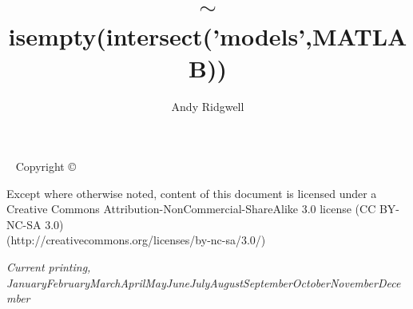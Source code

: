 \documentclass{tufte-book} %
\title{\(\sim\)isempty(intersect('models',MATLAB))} %
\author{Andy Ridgwell} %
\newcommand{\monthyear}{\ifcase\month\or January\or February\or March\or April\or May\or June\or July\or August\or September\or October\or November\or December\fi\space\number\year} %
\begin{document}
\frontmatter


\maketitle %


\newpage
\begin{fullwidth}
~\vfill
\thispagestyle{empty}
\setlength{\parindent}{0pt}
\setlength{\parskip}{\baselineskip}
Copyright \copyright\ \the\year\ \thanklessauthor

\par{}

\par Except where otherwise noted, content of this document is licensed under a 
\\Creative Commons Attribution-NonCommercial-ShareAlike 3.0 license (CC BY-NC-SA 3.0) 
\\(http://creativecommons.org/licenses/by-nc-sa/3.0/)

\par\textit{Current printing, \monthyear}
\end{fullwidth}


\tableofcontents %

\setcounter{chapter}{0}%


\listoffigures %


\listoftables %

\end{document}
